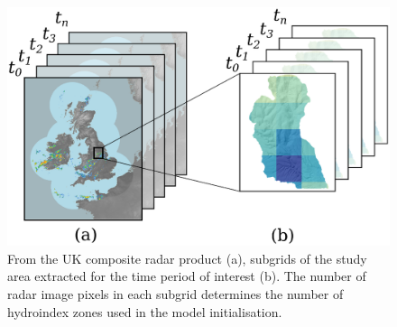 \begin{figure}[htb]
\includegraphics[width=15cm]{chp_radar/cropradar.eps}
\caption{From the UK composite radar product (a), subgrids of the study area extracted for the time period of interest (b). The number of radar image pixels in each subgrid determines the number of hydroindex zones used in the model initialisation.}
\label{fig_radar_extract}
\end{figure}

